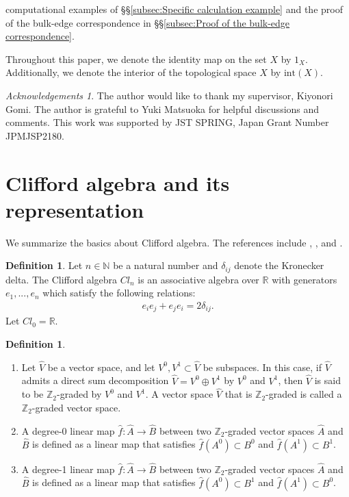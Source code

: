 \documentclass{amsart}
\theoremstyle{definition}
\newtheorem{dfn}[thm]{Definition}
\theoremstyle{remark}
\newtheorem*{acknowledgment}{Acknowledgements}
\begin{document}
computational examples of \S\S \ref{subsec:Specific calculation example} and the proof of the bulk-edge correspondence in \S\S \ref{subsec:Proof of the bulk-edge correspondence}.

Throughout this paper, we denote the identity map on the set $X$ by $1_X$. Additionally, we denote the interior of the topological space $X$ by $\text{int}(X)$.


\medskip



\begin{acknowledgment}
The author would like to thank my supervisor, Kiyonori Gomi. The author is grateful to Yuki Matsuoka for helpful discussions and comments. This work was supported by JST SPRING, Japan Grant Number JPMJSP2180.
\end{acknowledgment}
  


\section{Clifford algebra and its representation}
\label{sec:Clifford algebra}

We summarize the basics about Clifford algebra. The references include \cite{A-B-S}, \cite{Lawson}, and \cite{Furuta}.


\begin{dfn}
Let $n \in \mathbb{N}$ be a natural number and \(\delta_{ij}\) denote the Kronecker delta. The Clifford algebra $Cl_{n}$ is an associative algebra over $\mathbb{R}$ with generators $e_{1},...,e_{n}$ which satisfy the following relations:
\begin{align*}
e_ie_j+e_je_i=2\delta_{ij}.
\end{align*}
Let $Cl_0=\mathbb{R}.$
\end{dfn}

\begin{dfn}
\begin{enumerate}
\item Let \(\hat{V}\) be a vector space, and let \(V^0, V^1 \subset \hat{V}\) be subspaces. 
In this case, if \(\hat{V}\) admits a direct sum decomposition \(\hat{V} = V^0 \oplus V^1\) 
by \(V^0\) and \(V^1\), then \(\hat{V}\) is said to be \(\mathbb{Z}_2\)-graded by \(V^0\) 
and \(V^1\). A vector space \(\hat{V}\) that is \(\mathbb{Z}_2\)-graded is called a 
\(\mathbb{Z}_2\)-graded vector space.

\item A degree-0 linear map \(\hat{f}: \hat{A} \to \hat{B}\) between two \(\mathbb{Z}_2\)-graded 
vector spaces \(\hat{A}\) and \(\hat{B}\) is defined as a linear map that satisfies 
\(\hat{f}(A^0) \subset B^0\) and \(\hat{f}(A^1) \subset B^1\).
\item A degree-1 linear map \(\hat{f}: \hat{A} \to \hat{B}\) between two \(\mathbb{Z}_2\)-graded 
vector spaces \(\hat{A}\) and \(\hat{B}\) is defined as a linear map that satisfies 
\(\hat{f}(A^0) \subset B^1\) and \(\hat{f}(A^1) \subset B^0\).
\end{enumerate}
\end{dfn}
\end{document}
